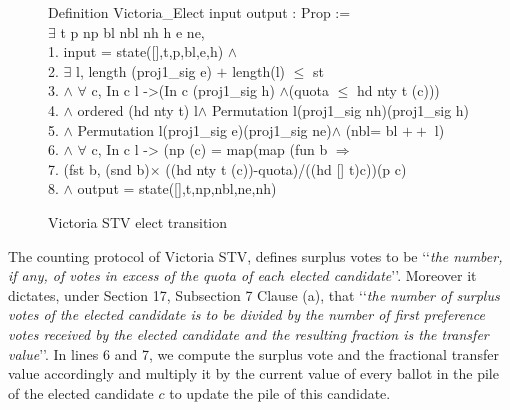 \documentclass{llncs}
\begin{document}
\begin{scriptsize}
\begin{figure}[b]
{\selectfont
 Definition Victoria\_Elect \textsf{input} \textsf{output} : Prop :=\\ $\exists$ t p np bl nbl nh h e ne, \\
     1. \textsf{input} = \textsf{state}([],t,p,bl,e,h) $\wedge$\\
     2. $\exists$ l, \textsf{length} (proj1\_sig e) $+$ \textsf{length}(l)  $\leq$ st \\
  3. $\wedge$ $\forall$ c, In c l ->(In c (proj1\_sig h) $\wedge$(quota $\leq$ \textsf{hd} nty t (c)))\\
 4.   $\wedge$ \textsf{ordered} (\textsf{hd} nty t) l$\wedge$ \textsf{Permutation} l(proj1\_sig nh)(proj1\_sig h) \\
 5. $\wedge$ \textsf{Permutation} l(proj1\_sig e)(proj1\_sig ne)$\wedge$ (nbl= bl $++$ l)\\
 6. $\wedge$ $\forall$ c, In c l -> (np (c) = \textsf{map}(\textsf{map} (\textsf{fun} b $\Rightarrow$\\ 
 7. (\textsf{fst} b, (\textsf{snd} b)$\times$ ((\textsf{hd} nty t (c))-quota)/((\textsf{hd} [] t)c))(p c)\\
 8. $\wedge$ \textsf{output} = \textsf{state}([],t,np,nbl,ne,nh)
}
\caption{Victoria STV elect transition}
\label{fig;fig.3}
\end{figure}
\end{scriptsize}

The counting protocol of Victoria STV, defines surplus votes to be \lq\lq \emph{the number, if any, of votes in excess of the
quota of each elected candidate}\rq\rq. Moreover it dictates, under Section 17, Subsection 7 Clause (a), that \lq\lq  \emph{the number of surplus votes of the elected candidate is to be
divided by the number of first preference votes received by the
elected candidate and the resulting fraction is the transfer value}\rq\rq. In lines 6 and 7, we compute the surplus vote and the fractional transfer value accordingly and multiply it by the current value of every ballot in the pile of the elected candidate $c$ to update the pile of this candidate. 
\end{document}
